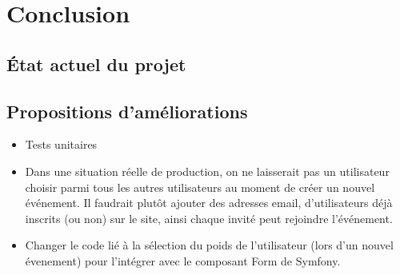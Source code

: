 \documentclass[a4paper, 12pt]{article}
\begin{document}
\section{Conclusion}
\subsection{État actuel du projet}

\subsection{Propositions d'améliorations}
\begin{itemize}
	\item Tests unitaires
	\item Dans une situation réelle de production, on ne laisserait pas un utilisateur choisir parmi tous les autres 
			utilisateurs au moment de créer un nouvel événement. Il faudrait plutôt ajouter des adresses email, 
			d'utilisateurs déjà inscrits (ou non) sur le site, ainsi chaque invité peut rejoindre l'événement.
	\item Changer le code lié à la sélection du poids de l'utilisateur (lors d'un nouvel évenement) pour l'intégrer 
			avec le composant Form de Symfony.
\end{itemize}
\end{document}
